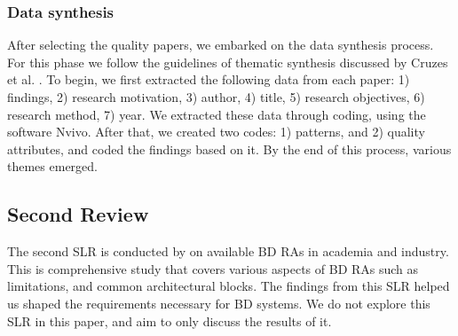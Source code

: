 \documentclass{bmcart}
\begin{document}
\subsubsection{Data synthesis}

After selecting the quality papers, we embarked on the data synthesis process. For this phase we follow the guidelines of thematic synthesis discussed by Cruzes et al. \cite{Cruzes.2011}. To begin, we first extracted the following data from each paper: 1) findings, 2) research motivation, 3) author, 4) title, 5) research objectives, 6) research method, 7) year. We extracted these data through coding, using the software Nvivo. After that, we created two codes: 1) patterns, and 2) quality attributes, and coded the findings based on it. By the end of this process, various themes emerged.



 



\subsection{Second Review} \label{secondReview}

The second SLR is conducted by \cite{ataei2022state} on available BD RAs in academia and industry. This is comprehensive study that covers various aspects of BD RAs such as limitations, and common architectural blocks. The findings from this SLR helped us shaped the requirements necessary for BD systems. We do not explore this SLR in this paper, and aim to only discuss the results of it.


\end{document}
